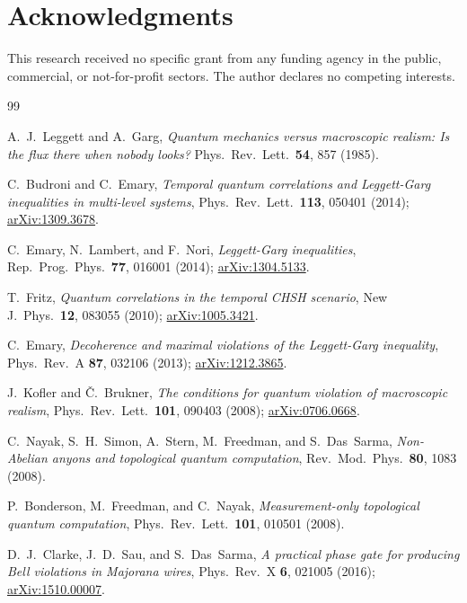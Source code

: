\documentclass[aps,prx,reprint,amsmath,amssymb,floatfix,nofootinbib,superscriptaddress]{revtex4-2}
\begin{document}
\section*{Acknowledgments}

This research received no specific grant from any funding agency in the
public, commercial, or not-for-profit sectors. The author declares no
competing interests.

\begin{thebibliography}{99}

A.~J.~Leggett and A.~Garg,
\emph{Quantum mechanics versus macroscopic realism: Is the flux there when nobody looks?}
Phys.\ Rev.\ Lett.\ \textbf{54}, 857 (1985).

C.~Budroni and C.~Emary,
\emph{Temporal quantum correlations and Leggett-Garg inequalities in multi-level systems},
Phys.\ Rev.\ Lett.\ \textbf{113}, 050401 (2014);
\href{https://arxiv.org/abs/1309.3678}{arXiv:1309.3678}.

C.~Emary, N.~Lambert, and F.~Nori,
\emph{Leggett-Garg inequalities},
Rep.\ Prog.\ Phys.\ \textbf{77}, 016001 (2014);
\href{https://arxiv.org/abs/1304.5133}{arXiv:1304.5133}.

T.~Fritz,
\emph{Quantum correlations in the temporal CHSH scenario},
New J.\ Phys.\ \textbf{12}, 083055 (2010);
\href{https://arxiv.org/abs/1005.3421}{arXiv:1005.3421}.

C.~Emary,
\emph{Decoherence and maximal violations of the Leggett-Garg inequality},
Phys.\ Rev.\ A \textbf{87}, 032106 (2013);
\href{https://arxiv.org/abs/1212.3865}{arXiv:1212.3865}.

J.~Kofler and \v{C}.~Brukner,
\emph{The conditions for quantum violation of macroscopic realism},
Phys.\ Rev.\ Lett.\ \textbf{101}, 090403 (2008);
\href{https://arxiv.org/abs/0706.0668}{arXiv:0706.0668}.

C.~Nayak, S.~H.~Simon, A.~Stern, M.~Freedman, and S.~Das~Sarma,
\emph{Non-Abelian anyons and topological quantum computation},
Rev.\ Mod.\ Phys.\ \textbf{80}, 1083 (2008).

P.~Bonderson, M.~Freedman, and C.~Nayak,
\emph{Measurement-only topological quantum computation},
Phys.\ Rev.\ Lett.\ \textbf{101}, 010501 (2008).

D.~J.~Clarke, J.~D.~Sau, and S.~Das~Sarma,
\emph{A practical phase gate for producing Bell violations in Majorana wires},
Phys.\ Rev.\ X \textbf{6}, 021005 (2016);
\href{https://arxiv.org/abs/1510.00007}{arXiv:1510.00007}.


\end{thebibliography}
\end{document}
